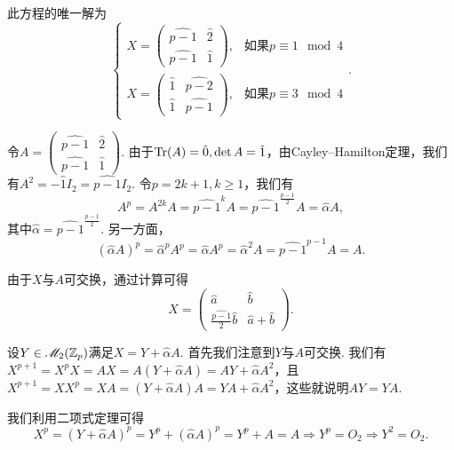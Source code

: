 \begin{solution}
    \begin{inparaenum}[(a)]\setcounter{enumi}{1}
      \item 此方程的唯一解为
      \[
          \begin{cases}
            X = \begin{pmatrix}
              \widehat{p-1} & \hat 2 \\
              \widehat{p-1} & \hat 1
            \end{pmatrix}, & \text{如果$p\equiv1\mod4$} \\
            X = \begin{pmatrix}
              \hat 1 & \widehat {p-2} \\
              \hat 1 & \widehat {p-1}
            \end{pmatrix}, & \text{如果$p\equiv3\mod4$}
          \end{cases}.
      \]

      令$A=\begin{pmatrix}
              \widehat{p-1} & \hat 2 \\
              \widehat{p-1} & \hat 1
            \end{pmatrix}$. 由于$\operatorname{Tr}(A)=\hat0,\det A=\hat1$，由Cayley--Hamilton定理，我们有$A^2=-\hat1I_2=\widehat{p-1}I_2$. 令$p=2k+1,k\ge1$，我们有
            \[
              A^p = A^{2k}A = \widehat{p-1}^kA = \widehat{p-1}^{\frac{p-1}2} A = \hat \alpha A,
            \]
      其中$\hat \alpha = \widehat{p-1}^{\frac{p-1}2}$. 另一方面，
      \[
        (\hat \alpha A)^p = \hat \alpha^pA^p = \hat \alpha A^p = \hat\alpha^2A = \widehat{p-1}^{p-1}A = A.
      \]

      由于$X$与$A$可交换，通过计算可得
      \[
        X = \begin{pmatrix}
          \hat a & \hat b \\
          \frac{\widehat{p-1}}2\hat b & \hat a + \hat b
        \end{pmatrix}.
      \]

      设$Y\in\mathscr M_2(\mathbb Z_p)$满足$X=Y+\hat\alpha A$. 首先我们注意到$Y$与$A$可交换. 我们有$X^{p+1}=X^pX=AX=A(Y+\hat\alpha A)=AY+\hat\alpha A^2$，且$X^{p+1}=XX^p=XA=(Y+\hat \alpha A)A=YA+\hat\alpha A^2$，这些就说明$AY=YA$.

      我们利用二项式定理可得
      \[
        X^p = (Y + \hat\alpha A)^p = Y^p + (\hat\alpha A)^p = Y^p + A = A \Rightarrow
        Y^p = O_2 \Rightarrow Y^2 = O_2.
      \]


\end{inparaenum}
\end{solution}

